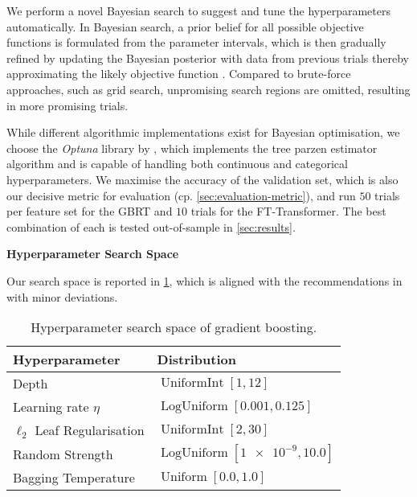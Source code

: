 We perform a novel Bayesian search to suggest and tune the hyperparameters automatically. In Bayesian search, a prior belief for all possible objective functions is formulated from the parameter intervals, which is then gradually refined by updating the Bayesian posterior with data from previous trials thereby approximating the likely objective function \autocite[][2]{shahriariTakingHumanOut2016}. Compared to brute-force approaches, such as grid search, unpromising search regions are omitted, resulting in more promising trials.

While different algorithmic implementations exist for Bayesian optimisation, we choose the \emph{Optuna} library by \textcite[][1--10]{akibaOptunaNextgenerationHyperparameter2019}, which implements the tree parzen estimator algorithm and is capable of handling both continuous and categorical hyperparameters. We maximise the accuracy of the validation set, which is also our decisive metric for evaluation (cp. \cref{sec:evaluation-metric}), and run $\num{50}$ trials per feature set for the \gls{GBRT} and $\num{10}$ trials for the FT-Transformer. The best combination of each is tested out-of-sample in \cref{sec:results}.

\textbf{Hyperparameter Search Space}

Our search space is reported in \cref{tab:hyperparameter-space-gbm}, which is aligned with the recommendations in \textcites[][20]{prokhorenkovaCatBoostUnbiasedBoosting2018}[][18]{gorishniyRevisitingDeepLearning2021}[][4]{rubachevRevisitingPretrainingObjectives2022} with minor deviations.

\begin{table}[H]
    \centering
    \caption[Hyperparameter Search Space of Gradient Boosting]{Hyperparameter search space of gradient boosting.}
    \label{tab:hyperparameter-space-gbm}
    \begin{tabular}{@{}ll@{}}
        \toprule
        Hyperparameter               & Distribution                                  \\ \midrule
        Depth                        & $\operatorname{UniformInt}[1,12]$             \\
        Learning rate $\eta$         & $\operatorname{LogUniform}[0.001, 0.125]$     \\
        $\ell_2$ Leaf Regularisation & $\operatorname{UniformInt}[2, 30]$            \\
        Random Strength              & $\operatorname{LogUniform}[\num{1e-9}, 10.0]$ \\
        Bagging Temperature          & $\operatorname{Uniform}[0.0, 1.0]$            \\ \bottomrule
    \end{tabular}
\end{table}


